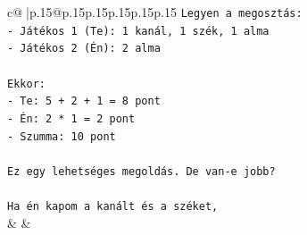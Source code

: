 \documentclass{article}
\begin{document}
{\begin{supertabular}{c@{$\;$}|p{.15\linewidth}@{}p{.15\linewidth}p{.15\linewidth}p{.15\linewidth}p{.15\linewidth}p{.15\linewidth}}
{{{\texttt{Legyen a megosztás:} \\
\texttt{{-} Játékos 1 (Te): 1 kanál, 1 szék, 1 alma} \\
\texttt{{-} Játékos 2 (Én): 2 alma} \\
\\ 
\texttt{Ekkor:} \\
\texttt{{-} Te: 5 + 2 + 1 = 8 pont} \\
\texttt{{-} Én: 2 * 1 = 2 pont} \\
\texttt{{-} Szumma: 10 pont} \\
\\ 
\texttt{Ez egy lehetséges megoldás. De van{-}e jobb?} \\
\\ 
\texttt{Ha én kapom a kanált és a széket,} \\
            }
        }
    }
    & & \\ \\


\end{supertabular}}
\end{document}
